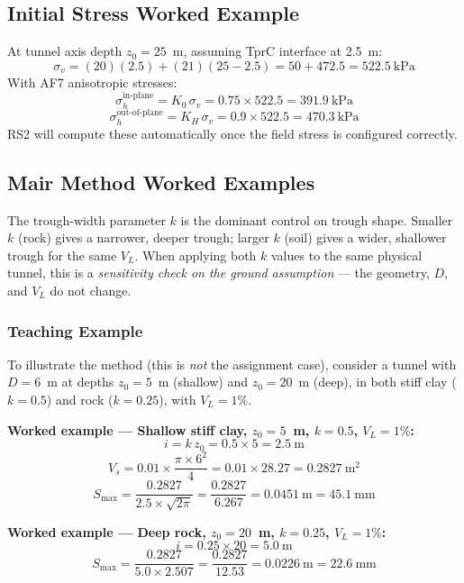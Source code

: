 \documentclass[a4paper,12pt]{article}
\begin{document}
\subsection{Initial Stress Worked Example}
At tunnel axis depth $z_0 = 25$~m, assuming TprC interface at 2.5~m:
\[
\sigma_v = (20)(2.5) + (21)(25 - 2.5) = 50 + 472.5 = 522.5\ \text{kPa}
\]
With AF7 anisotropic stresses:
\[
\sigma_h^{\text{in-plane}} = K_0 \, \sigma_v = 0.75 \times 522.5 = 391.9\ \text{kPa}
\]
\[
\sigma_h^{\text{out-of-plane}} = K_H \, \sigma_v = 0.9 \times 522.5 = 470.3\ \text{kPa}
\]
RS2 will compute these automatically once the field stress is configured correctly.

\subsection{Mair Method Worked Examples}

\begin{notebox}[Sensitivity of $k$]
The trough-width parameter $k$ is the dominant control on trough shape. Smaller $k$ (rock) gives a narrower, deeper trough; larger $k$ (soil) gives a wider, shallower trough for the same $V_L$. When applying both $k$ values to the same physical tunnel, this is a \emph{sensitivity check on the ground assumption} --- the geometry, $D$, and $V_L$ do not change.
\end{notebox}

\subsubsection{Teaching Example}
To illustrate the method (this is \emph{not} the assignment case), consider a tunnel with $D = 6$~m at depths $z_0 = 5$~m (shallow) and $z_0 = 20$~m (deep), in both stiff clay ($k = 0.5$) and rock ($k = 0.25$), with $V_L = 1\%$.

\textbf{Worked example --- Shallow stiff clay, $z_0 = 5$~m, $k=0.5$, $V_L = 1\%$:}
\[
i = k \, z_0 = 0.5 \times 5 = 2.5\ \text{m}
\]
\[
V_s = 0.01 \times \frac{\pi \times 6^2}{4} = 0.01 \times 28.27 = 0.2827\ \text{m}^2
\]
\[
S_{\text{max}} = \frac{0.2827}{2.5 \times \sqrt{2\pi}} = \frac{0.2827}{6.267} = 0.0451\ \text{m} = 45.1\ \text{mm}
\]

\textbf{Worked example --- Deep rock, $z_0 = 20$~m, $k=0.25$, $V_L = 1\%$:}
\[
i = 0.25 \times 20 = 5.0\ \text{m}
\]
\[
S_{\text{max}} = \frac{0.2827}{5.0 \times 2.507} = \frac{0.2827}{12.53} = 0.0226\ \text{m} = 22.6\ \text{mm}
\]
\end{document}
